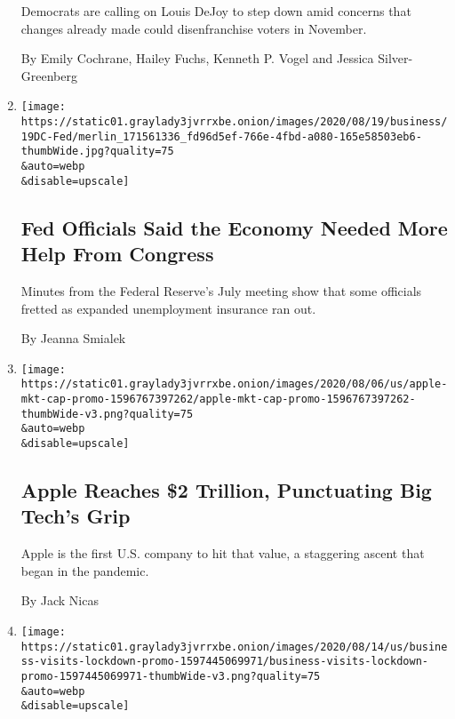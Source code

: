 \begin{enumerate}
  Democrats are calling on Louis DeJoy to step down amid concerns that
  changes already made could disenfranchise voters in November.

  By Emily Cochrane, Hailey Fuchs, Kenneth P. Vogel and Jessica
  Silver-Greenberg
\item
  \href{/2020/08/19/business/economy/fed-meeting-minutes-coronavirus.html}{}

  \texttt{[image: https://static01.graylady3jvrrxbe.onion/images/2020/08/19/business/19DC-Fed/merlin\_171561336\_fd96d5ef-766e-4fbd-a080-165e58503eb6-thumbWide.jpg?quality=75\\\&auto=webp\\\&disable=upscale]}

  \hypertarget{fed-officials-said-the-economy-needed-more-help-from-congress}{%
  \subsection{Fed Officials Said the Economy Needed More Help From
  Congress}\label{fed-officials-said-the-economy-needed-more-help-from-congress}}

  Minutes from the Federal Reserve's July meeting show that some
  officials fretted as expanded unemployment insurance ran out.

  By Jeanna Smialek
\item
  \href{/2020/08/19/technology/apple-2-trillion.html}{}

  \texttt{[image: https://static01.graylady3jvrrxbe.onion/images/2020/08/06/us/apple-mkt-cap-promo-1596767397262/apple-mkt-cap-promo-1596767397262-thumbWide-v3.png?quality=75\\\&auto=webp\\\&disable=upscale]}

  \hypertarget{apple-reaches-2-trillion-punctuating-big-techs-grip}{%
  \subsection{Apple Reaches \$2 Trillion, Punctuating Big Tech's
  Grip}\label{apple-reaches-2-trillion-punctuating-big-techs-grip}}

  Apple is the first U.S. company to hit that value, a staggering ascent
  that began in the pandemic.

  By Jack Nicas
\item
  \href{/interactive/2020/08/18/business/economy/coronavirus-economic-recovery-states.html}{}

  \texttt{[image: https://static01.graylady3jvrrxbe.onion/images/2020/08/14/us/business-visits-lockdown-promo-1597445069971/business-visits-lockdown-promo-1597445069971-thumbWide-v3.png?quality=75\\\&auto=webp\\\&disable=upscale]}


\end{enumerate}

